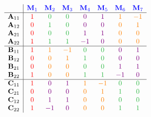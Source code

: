     \vspace{-50pt}
    \begin{multicols}{2}
        \setlength{\arraycolsep}{3pt}
        \[\begin{array}{c|ccccccc}
                & \color{blue} \mathbf{M}_1 & \color{blue} \mathbf{M}_2 & \color{blue} \mathbf{M}_3 & \color{blue} \mathbf{M}_4 & \color{blue} \mathbf{M}_5 & \color{blue} \mathbf{M}_6 & \color{blue} \mathbf{M}_7 \\
                \hline
                \mathbf{A}_{11} & \color{red} 1 & \color{mycustomgreen} 0 & \color{mycustomgreen} 0 & \color{violet} 0 & \color{violet} 1 & \color{orange} 1 & \color{orange} -1 \\
                \mathbf{A}_{12} & \color{red} 0 & \color{mycustomgreen} 1 & \color{mycustomgreen} 0 & \color{violet} 0 & \color{violet} 0 & \color{orange} 0 & \color{orange} 1 \\
                \mathbf{A}_{21} & \color{red} 0 & \color{mycustomgreen} 0 & \color{mycustomgreen} 0 & \color{violet} 1 & \color{violet} 1 & \color{orange} 0 & \color{orange} 0 \\
                \mathbf{A}_{22} & \color{red} 1 & \color{mycustomgreen} 1 & \color{mycustomgreen} 1 & \color{violet} -1 & \color{violet} 0 & \color{orange} 0 & \color{orange} 0 \\
                \hline
                \mathbf{B}_{11} & \color{red} 1 & \color{orange} 1 & \color{orange} -1 & \color{mycustomgreen} 0 & \color{mycustomgreen} 0 & \color{violet} 0 & \color{violet} 1 \\
                \mathbf{B}_{12} & \color{red} 0 & \color{orange} 0 & \color{orange} 1 & \color{mycustomgreen} 1 & \color{mycustomgreen} 0 & \color{violet} 0 & \color{violet} 0 \\
                \mathbf{B}_{21} & \color{red} 0 & \color{orange} 0 & \color{orange} 0 & \color{mycustomgreen} 0 & \color{mycustomgreen} 0 & \color{violet} 1 & \color{violet} 1 \\
                \mathbf{B}_{22} & \color{red} 1 & \color{orange} 0 & \color{orange} 0 & \color{mycustomgreen} 1 & \color{mycustomgreen} 1 & \color{violet} -1 & \color{violet} 0 \\
                \hline
                \mathbf{C}_{11} & \color{red} 1 & \color{violet} 0 & \color{violet} 1 & \color{orange} 1 & \color{orange} -1 & \color{mycustomgreen} 0 & \color{mycustomgreen} 0 \\
                \mathbf{C}_{21} & \color{red} 0 & \color{violet} 0 & \color{violet} 0 & \color{orange} 0 & \color{orange} 1 & \color{mycustomgreen} 1 & \color{mycustomgreen} 0 \\
                \mathbf{C}_{12} & \color{red} 0 & \color{violet} 1 & \color{violet} 1 & \color{orange} 0 & \color{orange} 0 & \color{mycustomgreen} 0 & \color{mycustomgreen} 0 \\
                \mathbf{C}_{22} & \color{red} 1 & \color{violet} -1 & \color{violet} 0 & \color{orange} 0 & \color{orange} 0 & \color{mycustomgreen} 1 & \color{mycustomgreen} 1 \\
        \end{array}\]
    

\end{multicols}

